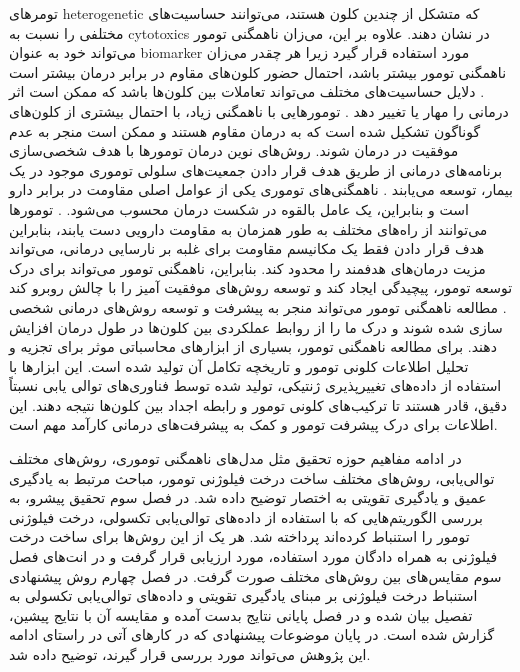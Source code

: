 تومرهای
\gls{heterogenetic}
که متشکل از چندین کلون هستند، می‌توانند حساسیت‌های مختلفی را نسبت به \glspl{cytotoxic} در نشان دهند. علاوه بر این، می‌زان  ناهمگنی تومور می‌تواند خود به عنوان \gls{biomarker} مورد استفاده قرار گیرد زیرا هر چقدر می‌زان ناهمگنی تومور بیشتر باشد، احتمال حضور کلون‌های مقاوم در برابر درمان بیشتر است \cite{truninger2005immunohistochemical}. دلایل حساسیت‌های مختلف می‌تواند تعاملات بین کلون‌ها باشد که ممکن است اثر درمانی را مهار یا تغییر دهد \cite{birbrair2014type}. تومورهایی با ناهمگنی زیاد، با احتمال بیشتری از کلون‌های گوناگون تشکیل شده است که به درمان مقاوم هستند و ممکن است منجر به عدم موفقیت در درمان شوند. روش‌های نوین درمان تومور‌ها با هدف شخصی‌سازی برنامه‌های درمانی از طریق هدف قرار دادن جمعیت‌های سلولی توموری موجود در یک بیمار، توسعه می‌یابند \cite{fedele2014navigating}. ناهمگنی‌های توموری یکی از عوامل اصلی مقاومت در برابر دارو است و بنابراین، یک عامل بالقوه  در شکست درمان محسوب می‌شود. \cite{fedele2014navigating}. تومور‌ها می‌توانند از راه‌های مختلف به طور همزمان به مقاومت دارویی دست یابند، بنابراین هدف قرار دادن فقط یک مکانیسم مقاومت برای غلبه بر نارسایی درمانی، می‌تواند مزیت درمان‌های هدفمند را محدود کند\cite{burrell2014tumour}. بنابراین، ناهمگنی تومور می‌تواند برای درک توسعه تومور، پیچیدگی ایجاد کند و توسعه روش‌های موفقیت آمیز را با چالش روبرو کند \cite{fedele2014navigating}. مطالعه ناهمگنی تومور می‌تواند منجر به پیشرفت و توسعه روش‌های درمانی شخصی سازی شده شوند و درک ما را از روابط عملکردی بین کلون‌ها در طول درمان افزایش دهند\cite{burrell2014tumour}. برای مطالعه ناهمگنی تومور، بسیاری از ابزار‌های محاسباتی موثر برای تجزیه و تحلیل اطلاعات کلونی تومور و تاریخچه تکامل آن تولید شده است. این ابزار‌ها با استفاده از داده‌های تغییرپذیری ژنتیکی، تولید شده توسط فناوری‌های توالی یابی نسبتاً دقیق، قادر هستند تا ترکیب‌های کلونی تومور و رابطه اجداد بین کلون‌ها نتیجه دهند. این اطلاعات برای درک پیشرفت تومور و کمک به پیشرفت‌های درمانی کارآمد مهم است. 


در ادامه مفاهیم حوزه تحقیق مثل مدل‌های ناهمگنی توموری، روش‌های مختلف توالی‌یابی، ‌روش‌های مختلف ساخت درخت فیلوژنی تومور، مباحث مرتبط به یادگیری عمیق و یادگیری تقویتی به اختصار توضیح داده شد. در فصل سوم تحقیق پیشرو، به بررسی الگوریتم‌هایی که با استفاده از داده‌های توالی‌یابی تکسولی، درخت فیلوژنی تومور را استنباط کرده‌اند پرداخته شد. هر یک از این روش‌ها برای ساخت درخت فیلوژنی به همراه دادگان مورد استفاده، مورد ارزیابی قرار گرفت و در انت‌های فصل سوم مقایس‌های بین روش‌های مختلف صورت گرفت. در فصل چهارم روش پیشنهادی استنباط درخت فیلوژنی بر مبنای یادگیری تقویتی و داده‌های توالی‌یابی تکسولی به تفصیل بیان شده و در فصل پایانی نتایج بدست آمده و مقایسه آن با نتایج پیشین، گزارش شده است. در پایان موضوعات پیشنهادی که در کار‌های آتی در راستای ادامه این پژوهش می‌تواند مورد بررسی قرار گیرند، توضیح داده شد. 